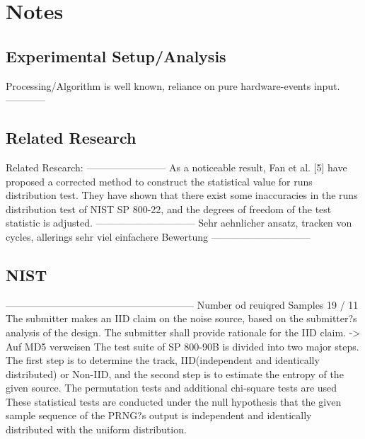 \chapter{Notes}
\label{cha:notes}

\section{Experimental Setup/Analysis}
Processing/Algorithm is well known, reliance on pure hardware-events input.
------------

\section{Related Research}
 Related Research: 
 ------------------------
 As a noticeable result, Fan et al. [5]
 have proposed a corrected method to construct the statistical
 value for runs distribution test. They have shown that there
 exist some inaccuracies in the runs distribution test of NIST
 SP 800-22, and the degrees of freedom of the test statistic
 is adjusted. 
  \cite{kangadditional}
------------------------------
 Sehr aehnlicher ansatz, tracken von cycles, allerings sehr viel einfachere Bewertung 
 \cite{yoo2017analysis}
------------------------------

\section{NIST}



---------------------------------------------------------
 Number od reuiqred Samples 19 / 11 \cite{turan2018nist} 
The submitter makes an IID claim on the noise source, based on the submitter?s analysis of the design. The submitter shall provide rationale for the IID claim. \cite{turan2018nist} -> Auf MD5 verweisen
 The test suite of SP 800-90B is divided into two major steps. The first step is to determine the track, IID(independent and identically distributed) or Non-IID, and the second step is to estimate the entropy of the given source. The permutation tests and additional chi-square tests are used \cite{kangadditional}
These statistical tests are conducted under the null hypothesis that the
given sample sequence of the PRNG?s output is independent
and identically distributed with the uniform distribution.
 \cite{kangadditional}


